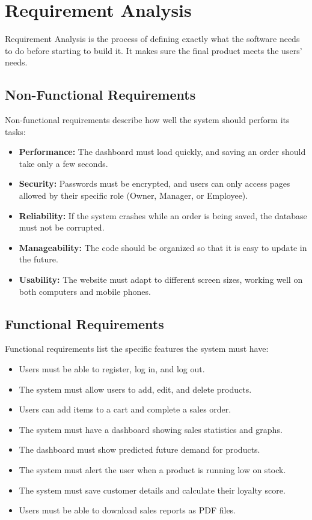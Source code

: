 \documentclass[12pt,a4paper]{report}
\begin{document}
\section{Requirement Analysis}
Requirement Analysis is the process of defining exactly what the software needs to do before starting to build it. It makes sure the final product meets the users' needs.

\subsection{Non-Functional Requirements}
Non-functional requirements describe how well the system should perform its tasks:
\begin{itemize}
    \item \textbf{Performance:} The dashboard must load quickly, and saving an order should take only a few seconds.
    \item \textbf{Security:} Passwords must be encrypted, and users can only access pages allowed by their specific role (Owner, Manager, or Employee).
    \item \textbf{Reliability:} If the system crashes while an order is being saved, the database must not be corrupted.
    \item \textbf{Manageability:} The code should be organized so that it is easy to update in the future.
    \item \textbf{Usability:} The website must adapt to different screen sizes, working well on both computers and mobile phones.
\end{itemize}

\subsection{Functional Requirements}
Functional requirements list the specific features the system must have:
\begin{itemize}
    \item Users must be able to register, log in, and log out.
    \item The system must allow users to add, edit, and delete products.
    \item Users can add items to a cart and complete a sales order.
    \item The system must have a dashboard showing sales statistics and graphs.
    \item The dashboard must show predicted future demand for products.
    \item The system must alert the user when a product is running low on stock.
    \item The system must save customer details and calculate their loyalty score.
    \item Users must be able to download sales reports as PDF files.
\end{itemize}
\end{document}
